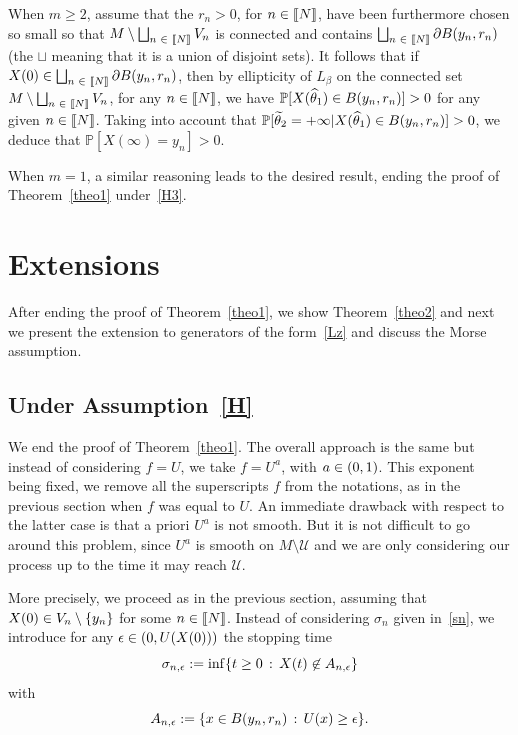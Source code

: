 \documentclass[10pt]{amsart}
\theoremstyle{definition}\newtheorem{defi}[theo]{Definition}\newtheorem{rema}[theo]{Remark}\newtheorem{exam}[theo]{Example}\newtheorem{exem}[theo]{Example}\newtheorem{nota}[theo]{Notation}
\newcommand{\cU}{\mathcal{U}}
\newcommand{\PP}{\mathbb{P}}
\newcommand{\iy}{\infty}
\newcommand{\pa}{\partial}
\newcommand{\wi}{\widetilde}
\newcommand{\wit}{\widehat}
\let\oldin\in
\renewcommand{\in}{\mathchoice{\oldin}{\oldin}{\,\oldin\,}{\,\oldin\,}}
\newcommand{\llbracket}{\mathopen{[\mkern -2.7mu[}}
\newcommand{\rrbracket}{\mathclose{]\mkern -2.7mu]}}
\newcommand{\lin}{\llbracket}
\newcommand{\rin}{\rrbracket}
\begin{document}
When $m\geq 2$, assume that the $r_n>0$, for $n\in\lin N\rin$, have been furthermore chosen so small so that $M\setminus \bigsqcup_{n\in\lin N\rin} V_n$ is connected and contains $\bigsqcup_{n\in\lin N\rin}\pa B(y_n,r_n)$ (the $\sqcup$ meaning that it is a union of disjoint sets). It follows that if $X(0)\in \bigsqcup_{n\in\lin N\rin}\pa B(y_n,r_n)$, then by ellipticity of $L_\beta$ on the connected set $M\setminus \bigsqcup_{n\in\lin N\rin} V_n$, for any $n\in\lin N\rin$, we have $\PP[X(\wit\theta_1)\in B(y_n,r_n)]>0$ for any given $n\in\lin N\rin$. Taking into account that $\PP[\wi\theta_2=+\iy\vert X(\wit\theta_1)\in B(y_n,r_n)]>0$, we deduce that $\PP[X(\iy)=y_n]>0$.


When $m=1$, a similar reasoning leads to the desired result, ending the proof of Theorem~\ref{theo1} under~\eqref{H3}.



\section{Extensions}\label{e}

After ending the proof of Theorem~\ref{theo1}, we show Theorem~\ref{theo2} and next we present the extension to generators of the form~\eqref{Lz} and discuss the Morse assumption.

\subsection{Under Assumption~\eqref{H}}

We end the proof of Theorem~\ref{theo1}. The overall approach is the same but instead of considering $f=U$, we take $f=U^a$, with $a\in (0,1)$. This exponent being fixed, we remove all the superscripts $f$ from the notations, as in the previous section when $f$ was equal to $U$. An immediate drawback with respect to the latter case is that a priori $U^a$ is not smooth. But it is not difficult to go around this problem, since $U^a$ is smooth on $M\setminus\cU$ and we are only considering our process up to the time it may reach $\cU$.


More precisely, we proceed as in the previous section, assuming that $X(0)\in V_n\setminus\{y_n\}$ for some $n\in\lin N\rin$. Instead of considering $\sigma_n$ given in~\eqref{sn}, we introduce for any $\epsilon\in(0,U(X(0)))$ the stopping time
\begin{equation*}
\sigma_{n,\epsilon} := \inf\{t\geq 0\,:\, X(t)\not\in A_{n,\epsilon}\}
\end{equation*}
with
\begin{equation*} 
A_{n,\epsilon}:= \{x\in B(y_n,r_n)\,:\, U(x)\geq \epsilon\}.
\end{equation*}
\end{document}
